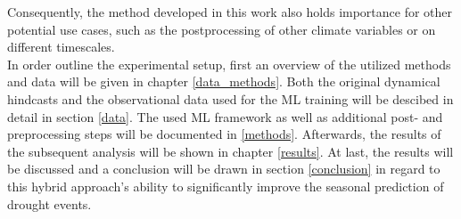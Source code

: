 \documentclass[ba-lentz.tex]{subfile}
\begin{document}
Consequently, the method developed in this work also holds importance for other potential use cases, such as the postprocessing of other climate variables or on different timescales. \\
In order outline the experimental setup, first an overview of the utilized methods and data will be given in chapter \ref{data_methods}.
Both the original dynamical hindcasts and the observational data used for the ML training will be descibed in detail in section \ref{data}.
The used ML framework as well as additional post- and preprocessing steps will be documented in \ref{methods}.
Afterwards, the results of the subsequent analysis will be shown in chapter \ref{results}.
At last, the results will be discussed and a conclusion will be drawn in section \ref{conclusion} in regard to this hybrid approach's ability to significantly improve the seasonal prediction of drought events.
\end{document}

